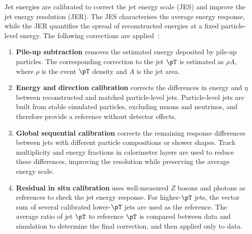 Jet energies are calibrated to correct the jet energy scale (JES) and improve the jet energy resolution (JER).
The JES characterises the average energy response, while the JER quantifies the spread of reconstructed energies at a fixed particle-level energy.
The following corrections are applied~\cite{ATLAS2021JetCalibration}:
\begin{enumerate}
    \item \textbf{Pile-up subtraction} removes the estimated energy deposited by pile-up particles. The corresponding correction to the jet $\pT$ is estimated as $\rho A$, where $\rho$ is the event $\pT$ density and $A$ is the jet area.
    \item \textbf{Energy and direction calibration} corrects the differences in energy and $\eta$ between reconstructed and matched particle-level jets. Particle-level jets are built from stable simulated particles, excluding muons and neutrinos, and therefore provide a reference without detector effects.
    \item \textbf{Global sequential calibration} corrects the remaining response differences between jets with different particle compositions or shower shapes. Track multiplicity and energy fractions in calorimeter layers are used to reduce these differences, improving the resolution while preserving the average energy scale.
    \item \textbf{Residual in situ calibration} uses well-measured $Z$ bosons and photons as references to check the jet energy response. For higher-$\pT$ jets, the vector sum of several calibrated lower-$\pT$ jets are used as the reference. The average ratio of jet $\pT$ to reference $\pT$ is compared between data and simulation to determine the final correction, and then applied only to data.
\end{enumerate}
